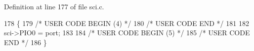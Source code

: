 Definition at line 177 of file sci.\+c.


\begin{DoxyCode}
178 \{
179 \textcolor{comment}{/* USER CODE BEGIN (4) */}
180 \textcolor{comment}{/* USER CODE END */}
181 
182     sci->PIO0 = port;
183 
184 \textcolor{comment}{/* USER CODE BEGIN (5) */}
185 \textcolor{comment}{/* USER CODE END */}
186 \}
\end{DoxyCode}
